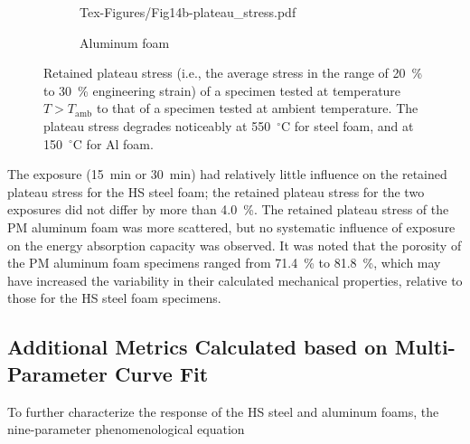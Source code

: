 \documentclass[review]{elsarticle}
\begin{document}
\begin{figure}
\begin{subfigure}{.5\textwidth}
		{Tex-Figures/Fig14b-plateau_stress.pdf}
		\caption{Aluminum foam}
		\label{fig3:sub2}
	\end{subfigure}
	\caption{Retained plateau stress (i.e., the average stress in the range of 20~\% to 30~\% engineering strain) of a specimen tested at temperature $T>T_\text{amb}$ to that of a specimen tested at ambient temperature. The plateau stress degrades noticeably at 550~$^{\circ}\mathrm{C}$ for steel foam, and at 150~$^{\circ}\mathrm{C}$ for Al foam.}
	\label{Plateu_stress}
\end{figure}

The exposure (15~min or 30~min) had relatively little influence on the retained plateau stress for the HS steel foam; the retained plateau stress for the two exposures did not differ by more than 4.0~\%. The retained plateau stress of the PM aluminum foam was more scattered, but no systematic influence of exposure on the energy absorption capacity was observed. It was noted that the porosity of the PM aluminum foam specimens ranged from 71.4~\% to 81.8~\%, which may have increased the variability in their calculated mechanical properties, relative to those for the HS steel foam specimens.

\subsection{Additional Metrics Calculated based on Multi-Parameter Curve Fit}

To further characterize the response of the HS steel and aluminum foams, the nine-parameter phenomenological equation
\end{document}
